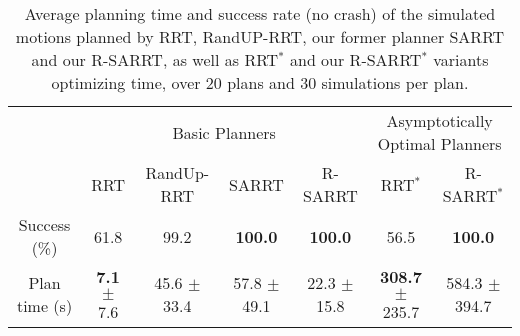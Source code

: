 \begin{table*}[t]
    \centering
    \begin{tabular}{l|llll|ll|}
    \cline{2-7}
    & \multicolumn{4}{c||}{Basic Planners} & \multicolumn{2}{c|}{Asymptotically Optimal Planners} \\ \cline{2-7} 
        & \multicolumn{1}{c|}{RRT} & \multicolumn{1}{c|}{RandUp-RRT} & \multicolumn{1}{c|}{SARRT} & \multicolumn{1}{c||}{R-SARRT} & \multicolumn{1}{c|}{RRT$^{*}$} & \multicolumn{1}{c|}{R-SARRT$^*$} \\ \hline
    \multicolumn{1}{|c|}{Success (\%)} & \multicolumn{1}{c|}{61.8}   & \multicolumn{1}{c|}{99.2} & \multicolumn{1}{c|}{\textbf{100.0}}  &   \multicolumn{1}{c||}{\textbf{100.0}}   & \multicolumn{1}{c|}{56.5}   &  \multicolumn{1}{c|}{\textbf{100.0}}   \\ \hline
    \multicolumn{1}{|c|}{Plan time (s)} & \multicolumn{1}{c|}{\textbf{7.1} $\pm$ 7.6}   & \multicolumn{1}{c|}{45.6 $\pm$ 33.4} & \multicolumn{1}{c|}{57.8 $\pm$ 49.1}  &   \multicolumn{1}{c||}{ 22.3 $\pm$ 15.8}  & \multicolumn{1}{c|}{\textbf{308.7} $\pm$ 235.7}   &  \multicolumn{1}{c|}{584.3 $\pm$ 394.7}    \\ \hline
    \end{tabular}
    \caption{
    \label{tab:Robust window}
    Average planning time and success rate (no crash) of the simulated motions planned by RRT, RandUP-RRT, our former planner SARRT and our R-SARRT, as well as RRT$^{*}$ and our  R-SARRT$^{*}$ variants optimizing time, over 20 plans and 30 simulations per plan.}
\end{table*}